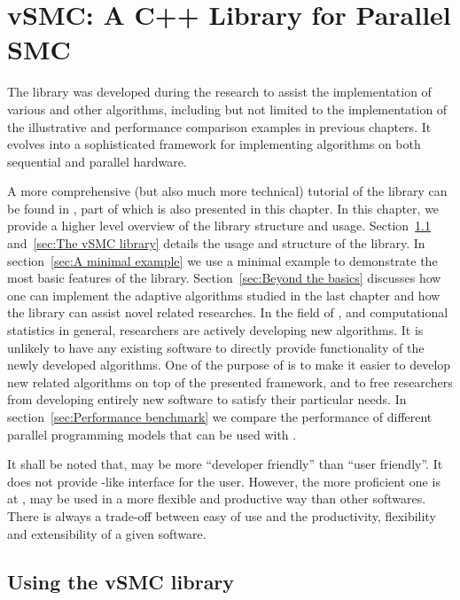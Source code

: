 \chapter{vSMC: A C++ Library for Parallel SMC}
\label{cha:vSMC: A C++ Library for Parallel SMC}

The \vsmc library \cite{software:VSMC} was developed during the research to
assist the implementation of various \smc and other algorithms, including but
not limited to the implementation of the illustrative and performance
comparison examples in previous chapters. It evolves into a sophisticated \cpp
framework for implementing \smc algorithms on both sequential and parallel
hardware.

A more comprehensive (but also much more technical) tutorial of the library
can be found in \cite{software:VSMC}, part of which is also presented in this
chapter. In this chapter, we provide a higher level overview of the library
structure and usage. Section~\ref{sec:Using the vSMC library} and~\ref{sec:The
  vSMC library} details the usage and structure of the library. In
section~\ref{sec:A minimal example} we use a minimal example to demonstrate
the most basic features of the library. Section~\ref{sec:Beyond the basics}
discusses how one can implement the adaptive algorithms studied in the last
chapter and how the library can assist novel \smc related researches. In the
field of \smc, and computational statistics in general, researchers are
actively developing new algorithms. It is unlikely to have any existing
software to directly provide functionality of the newly developed algorithms.
One of the purpose of \vsmc is to make it easier to develop new \smc related
algorithms on top of the presented framework, and to free researchers from
developing entirely new software to satisfy their particular needs. In
section~\ref{sec:Performance benchmark} we compare the performance of
different parallel programming models that can be used with \vsmc.

It shall be noted that, \vsmc may be more ``developer friendly'' than ``user
friendly''. It does not provide \bugs-like interface for the user. However,
the more proficient one is at \cpp, \vsmc may be used in a more flexible and
productive way than other softwares. There is always a trade-off between
easy of use and the productivity, flexibility and extensibility of a given
software.

\section{Using the vSMC library}
\label{sec:Using the vSMC library}


